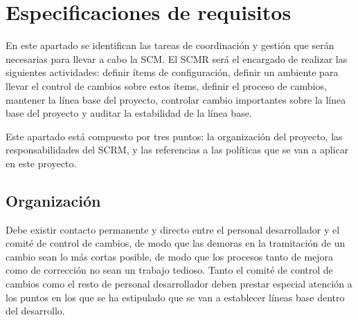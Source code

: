 \section{Especificaciones de requisitos}

\par En este apartado se identifican las tareas de coordinación y gestión que serán necesarias para llevar a cabo la SCM. El SCMR será el encargado de realizar las siguientes actividades: definir ítems de configuración, definir un ambiente para llevar el control de cambios sobre estos ítems, definir el proceso de cambios, mantener la línea base del proyecto, controlar cambio importantes sobre la línea base del proyecto y auditar la estabilidad de la línea base.

\par Este apartado está compuesto por tres puntos: la organización del proyecto, las responsabilidades del SCRM, y las referencias a las políticas que se van a aplicar en este proyecto.

\subsection{Organización}
Debe existir contacto permanente y directo entre el personal desarrollador y el comité de control de cambios, de modo que las demoras en la tramitación de un cambio sean lo más cortas posible, de modo que los procesos tanto de mejora como de corrección no sean un trabajo tedioso.
Tanto el comité de control de cambios como el resto de personal desarrollador deben prestar especial atención a los puntos en los que se ha estipulado que se van a establecer líneas base dentro del desarrollo.


